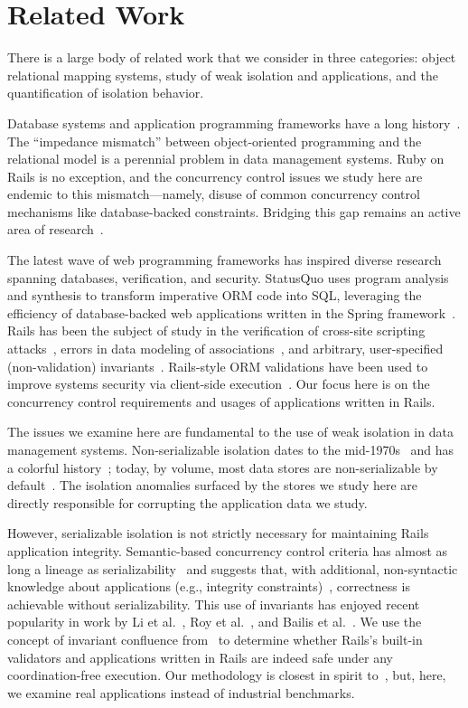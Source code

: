 
\section{Related Work}
\label{sec:relatedwork}

There is a large body of related work that we consider in
three categories: object relational mapping systems, study of weak
isolation and applications, and the quantification of isolation behavior.

 Database systems and application programming
frameworks have a long
history~\cite{objectstore,shore,bernstein-orm}. The ``impedance
mismatch'' between object-oriented programming and the relational
model is a perennial problem in data management systems. Ruby on Rails
is no exception, and the concurrency control issues we study here are
endemic to this mismatch---namely, disuse of common concurrency
control mechanisms like database-backed constraints. Bridging this gap
remains an active area of research~\cite{db-to-model}.

The latest wave of web programming frameworks has inspired diverse
research spanning databases, verification, and security. StatusQuo
uses program analysis and synthesis to transform imperative ORM code
into SQL, leveraging the efficiency of database-backed web
applications written in the Spring framework~\cite{statusquo}. Rails
has been the subject of study in the verification of cross-site
scripting attacks~\cite{rails-xss}, errors in data
modeling of associations~\cite{rails-bounded}, and arbitrary,
user-specified (non-validation) invariants~\cite{invariant-web}.
Rails-style ORM validations have been used to improve systems security
via client-side execution~\cite{waves,caveat}. Our focus here is on
the concurrency control requirements and usages of applications
written in Rails.

 The issues we examine here
are fundamental to the use of weak isolation in data management
systems. Non-serializable isolation dates to the
mid-1970s~\cite{gray-isolation} and has a colorful
history~\cite{adya-isolation}; today, by volume, most data stores are
non-serializable by default~\cite{hat-vldb}. The isolation anomalies
surfaced by the stores we study here are directly responsible for
corrupting the application data we study.

However, serializable isolation is not strictly necessary for
maintaining Rails application integrity. Semantic-based concurrency
control criteria has almost as long a lineage as
serializability~\cite{eswaran-consistency,ic-survey-two} and suggests
that, with additional, non-syntactic knowledge about applications
(e.g., integrity constraints)~\cite{kung1979optimality}, correctness
is achievable without serializability. This use of invariants has
enjoyed recent popularity in work by Li et al.~\cite{redblue-new}, Roy
et al.~\cite{writes-forest}, and Bailis et al.~\cite{coord-avoid}. We
use the concept of invariant confluence from~\cite{coord-avoid} to
determine whether Rails's built-in validators and applications written
in Rails are indeed safe under any coordination-free execution. Our
methodology is closest in spirit to~\cite{coord-avoid}, but, here, we
examine real applications instead of industrial benchmarks.

